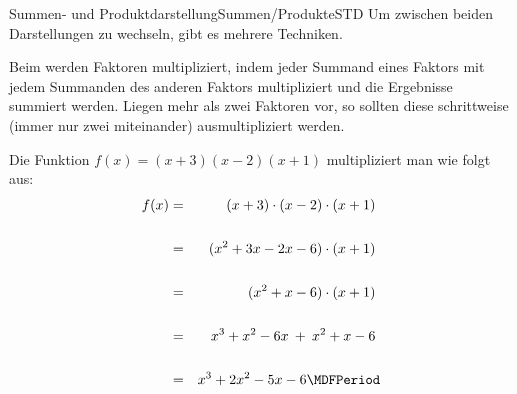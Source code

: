 \begin{MXContent}{Summen- und Produktdarstellung}{Summen/Produkte}{STD}
Um zwischen beiden Darstellungen zu wechseln, gibt es mehrere Techniken.

\begin{MInfo}
Beim  werden Faktoren multipliziert, indem jeder Summand eines Faktors mit jedem Summanden des anderen Faktors multipliziert und die Ergebnisse summiert werden.
Liegen mehr als zwei Faktoren vor, so sollten diese schrittweise (immer nur zwei miteinander) ausmultipliziert werden.
\end{MInfo}

\begin{MExample}
Die Funktion $f(x)=(x+3)(x-2)(x+1)$ multipliziert man wie folgt aus:
\begin{eqnarray*}
f(x)
& = & (x+3)\cdot (x-2)\cdot (x+1) \ \\ \ \\
& = & (x^2+3x-2x-6)\cdot (x+1) \ \\ \ \\
& = & (x^2+x-6)\cdot (x+1) \ \\ \ \\
& = & x^3+x^2-6x\: +\: x^2+x-6 \ \\ \ \\
& = & x^3+2x^2-5x-6 \MDFPeriod
\end{eqnarray*}
\end{MExample}


\end{MXContent}
